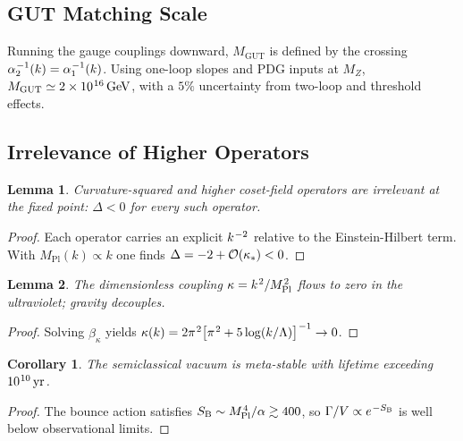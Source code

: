 \documentclass[pdflatex,sn-mathphys-num]{sn-jnl}
\theoremstyle{thmstyleone}
\newtheorem{lemma}[lemma]{Lemma}
\newtheorem{corollary}[corollary]{Corollary}
\theoremstyle{thmstyletwo}%
\theoremstyle{thmstylethree}%
\newcommand{\sm}{\hspace{.065em}}
\newcommand{\smexp}[1]{^{\sm #1}}
\begin{document}
\subsection{GUT Matching Scale}
\label{subsec:GUTscale}
Running the gauge couplings downward,
\(M_{\mathrm{GUT}}\) is defined by the crossing
\(
  \alpha_{2}\smexp{-1}(k)=\alpha_{1}\smexp{-1}(k)
\).
Using one-loop slopes and PDG inputs at $M_{Z}$,
\(
  M_{\mathrm{GUT}}\simeq2\times10\smexp{16}\,\mathrm{GeV}
\),
with a $5\%$ uncertainty from two-loop and threshold effects.

\subsection{Irrelevance of Higher Operators}
\label{subsec:HigherIrrel}
\begin{lemma}\label{lem:Irrel}
Curvature-squared and higher coset-field operators are irrelevant at
the fixed point:
\(
  \Delta<0
\)
for every such operator.
\end{lemma}

\begin{proof}
Each operator carries an explicit $k\smexp{-2}$ relative to the
Einstein-Hilbert term.  With
$M_{\mathrm{Pl}}(k)\propto k$ one finds
\(\Delta=-2+{\cal O}(\kappa_{\ast})<0\).
\end{proof}

\begin{lemma}\label{lem:kappaIrrel}
The dimensionless coupling
\(
  \kappa=k\smexp{2}/M_{\mathrm{Pl}}\smexp{2}
\)
flows to zero in the ultraviolet; gravity decouples.
\end{lemma}

\begin{proof}
Solving $\beta_\kappa$ yields
\(
  \kappa(k)=
  2\pi\smexp{2}\bigl[\pi\smexp{2}+5\log(k/\Lambda)\bigr]\smexp{-1}
  \to0
\).
\end{proof}

\begin{corollary}\label{cor:Metastable}
The semiclassical vacuum is meta-stable with lifetime exceeding
\(10\smexp{10}\,\mathrm{yr}\).
\end{corollary}

\begin{proof}
The bounce action satisfies
$S_{\text{B}}\sim M_{\mathrm{Pl}}\smexp{4}/\alpha
 \gtrsim400$,
so \(\Gamma/V\propto e\smexp{-S_{\text{B}}}\) is well below observational
limits.
\end{proof}
\end{document}
